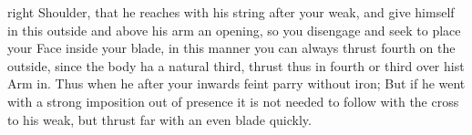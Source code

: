 \newpage


\newpage


right Shoulder, that he reaches with his string after your weak, and
give himself in this  outside and above his arm an opening, so you
disengage and seek to place your Face inside your blade, in this
manner you can always thrust fourth on the outside, since the body ha
a natural third, thrust thus in fourth or third over hist Arm in. Thus
when he after your inwards feint parry without iron; But if he went
with a strong imposition out of presence it is not needed to follow
with the cross to his weak, but thrust far with an even blade quickly.


